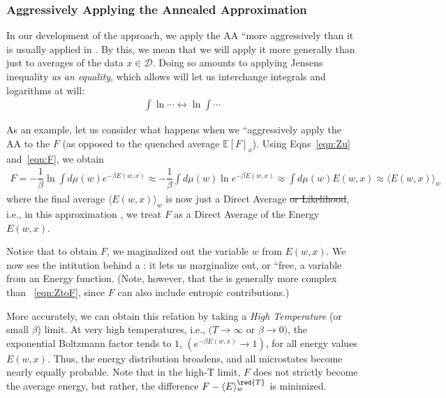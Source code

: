 
\subsubsection{Aggressively Applying the Annealed Approximation}

In our development of the \SETOL approach, we apply the AA ``more aggressively than it is usually applied in \STATMECH.
By this, we mean that we will apply it more generally than just to averages of the data $x\in\mathcal{D}$.
Doing so amounts to applying Jensens inequality \emph{as an equality}, which allows will let us interchange integrals and logarithms at will:
\begin{align}
\label{eqn:Jensens}
\int\ln\cdots \leftrightarrow \ln\int\cdots
\end{align}

\noindent
As an example, let us consider what happens when we ``aggressively apply the AA to the \FreeEnergy $F$ (as opposed to the quenched average  $\mathbb{E}[F]_{x}$).
Using Eqns~\ref{eqn:Zu} and~\ref{eqn:F}, we obtain
\begin{align}
\label{eqn:ZtoF}
F %
   =       -\dfrac{1}{\beta}\ln \int d\mu(w) e^{-\beta E(w,x)}  %
   \approx -\dfrac{1}{\beta}\int d\mu(w) \ln e^{-\beta E(w,x)}  %
   \approx \int d\mu(w) E(w,x)                                  %
   \approx \langle E(w,x)\rangle_{w}
\end{align}
where the final average $\langle E(w,x)\rangle_{w}$ is now just a Direct Average \st{or Likelihood}, i.e., 
in this approximation , we treat $F$ as a Direct Average of the Energy $E(w,x)$.

Notice that to obtain $F$, we maginalized out the variable $w$ from $E(w,x)$.
We now see the intitution behind a \FreeEnergy: it lets us marginalize out, or ``free, a variable from an Energy function.
(Note, however, that the \FreeEnergy is generally more complex than \EQN~\ref{eqn:ZtoF}, since $F$ can also include entropic contributions.)

More accurately, we can obtain this relation  by taking a \emph{High Temperature} (or small $\beta$) limit.
At very high temperatures, i.e., $( T \rightarrow \infty $ or $ \beta \rightarrow 0 )$,
the exponential Boltzmann factor tends to $1$,  $(e^{-\beta E(w,x)} \rightarrow 1)$,
for all energy values $ E(w,x)$.
Thus, the energy distribution broadens, and all microstates become nearly equally probable.
Note that in the high-T limit,
\FreeEnergy $F$ 
does not strictly become the average energy, but rather,
the difference $F -\langle E \rangle_{w}^{\red{T}} $ is minimized.


